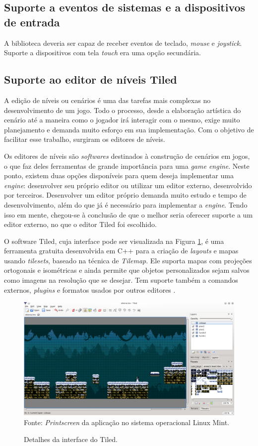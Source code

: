 \subsection{Suporte a eventos de sistemas e a dispositivos de entrada}
%
A biblioteca deveria ser capaz de receber eventos de teclado, \textit{mouse} e \textit{joystick}. Suporte a dispositivos com tela \textit{touch} era uma opção secundária.
%
\subsection{Suporte ao editor de níveis Tiled}
%
A edição de níveis ou cenários é uma das tarefas mais complexas no desenvolvimento de um jogo. Todo o processo, desde a elaboração artística do cenário até a maneira como o jogador irá interagir com o mesmo, exige muito planejamento e demanda muito esforço em sua implementação. Com o objetivo de facilitar esse trabalho, surgiram os editores de níveis. 
\par
Os editores de níveis são \textit{softwares} destinados à construção de cenários em jogos, o que faz deles ferramentas de grande importância para uma \textit{game engine}. Neste ponto, existem duas opções disponíveis para quem deseja implementar uma \textit{engine}: desenvolver seu próprio editor ou utilizar um editor externo, desenvolvido por terceiros. Desenvolver um editor próprio demanda muito estudo e tempo de desenvolvimento, além do que já é necessário para implementar a \textit{engine}. Tendo isso em mente, chegou-se à conclusão de que o melhor seria oferecer suporte a um editor externo, no que o editor Tiled foi escolhido. 
\par
O software Tiled, cuja interface pode ser visualizada na Figura \ref{tiledGUI}, é uma ferramenta gratuita desenvolvida em C++ para a criação de \textit{layouts} e mapas usando \textit{tilesets}, baseado na técnica de \textit{Tilemap}. Ele suporta mapas com projeções ortogonais e isométricas e ainda permite que objetos personalizados sejam salvos como imagens na resolução que se desejar. Tem suporte também a comandos externos, \textit{plugins} e formatos usados por outros editores \cite{SiteTiled}.
%
\begin{figure}[H]
    \centering
     \caption{Detalhes da interface do Tiled.}
    \label{tiledGUI}
    \includegraphics[scale = 0.45]{Imagens/Tiled.png}
    \\Fonte: \textit{Printscreen} da aplicação no sistema operacional Linux Mint.
\end{figure}

